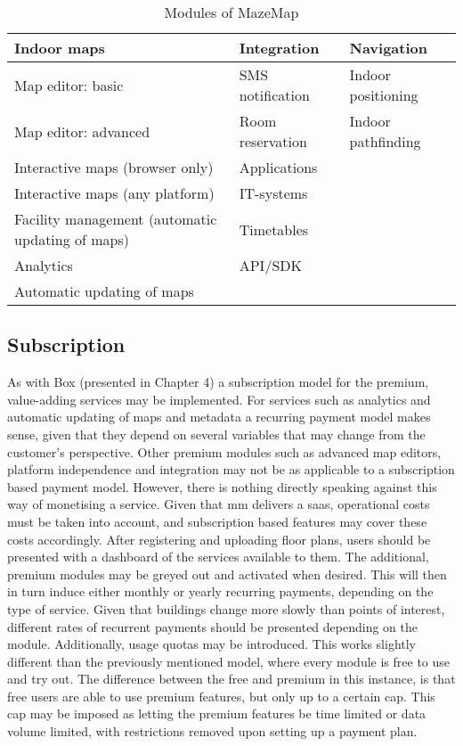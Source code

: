 \begin{table}[]
\centering
\caption{Modules of MazeMap}
\label{modules}
\begin{tabular}{|l|l|l|}
\hline
\textbf{Indoor maps}                             & \textbf{Integration} & \textbf{Navigation} \\ \hline
Map editor: basic                                & SMS notification     & Indoor positioning  \\ \hline
Map editor: advanced                             & Room reservation     & Indoor pathfinding  \\ \hline
Interactive maps (browser only)                  & Applications         &                     \\ \hline
Interactive maps (any platform)                  & IT-systems           &                     \\ \hline
Facility management (automatic updating of maps) & Timetables           &                     \\ \hline
Analytics                                        & API/SDK              &                     \\ \hline
Automatic updating of maps                       &                      &                     \\ \hline
\end{tabular}
\end{table}

\subsection{Subscription}
As with Box (presented in Chapter 4) a subscription model for the premium, value-adding services may be implemented. For services such as analytics and automatic updating of maps and metadata a recurring payment model makes sense, given that they depend on several variables that may change from the customer's perspective. Other premium modules such as advanced map editors, platform independence and integration may not be as applicable to a subscription based payment model. However, there is nothing directly speaking against this way of monetising a service. Given that \gls{mm} delivers a \gls{saas}, operational costs must be taken into account, and subscription based features may cover these costs accordingly. After registering and uploading floor plans, users should be presented with a dashboard of the services available to them. The additional, premium modules may be greyed out and activated when desired. This will then in turn induce either monthly or yearly recurring payments, depending on the type of service. Given that buildings change more slowly than points of interest, different rates of recurrent payments should be presented depending on the module. Additionally, usage quotas may be introduced. This works slightly different than the previously mentioned model, where every module is free to use and try out. The difference between the free and premium in this instance, is that free users are able to use premium features, but only up to a certain cap. This cap may be imposed as letting the premium features be time limited or data volume limited, with restrictions removed upon setting up a payment plan.  


